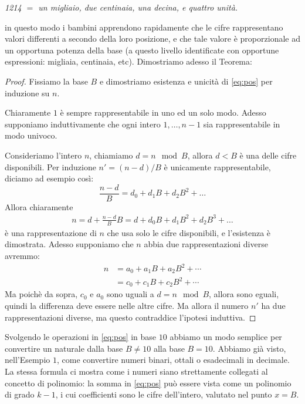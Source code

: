 {\it 1214 $ = $ un migliaio, due centinaia, una decina, e quattro unità.}

\noindent in questo modo i bambini apprendono rapidamente che le cifre
rappresentano valori differenti a secondo della loro posizione, e che tale
valore è proporzionale ad un opportuna potenza della base (a questo livello
identificate con opportune espressioni: migliaia, centinaia, etc). Dimostriamo
adesso il Teorema:

\begin{proof}%
Fissiamo la base $B$ e dimostriamo esistenza e unicità di \eqref{eq:pos} per induzione su $n$.

Chiaramente $1$ è sempre rappresentabile in uno ed un solo modo\footnotemark. Adesso supponiamo induttivamente che ogni intero
$1,\ldots,n-1$ sia rappresentabile in modo univoco.

\noindent Consideriamo l'intero $n$, chiamiamo $d = n \mod B$, allora $d < B$ è una delle cifre disponibili. Per induzione $n' = (n-d)/B$ è unicamente rappresentabile, diciamo ad esempio così:
\[ \frac{n-d}{B} = d_0 + d_1 B + d_2 B^2 + \ldots \]
Allora chiaramente
\begin{align*}
n = d + \frac{n-d}{B}B = d + d_0 B + d_1 B^2 + d_2 B^3 + \ldots
\end{align*}
è una rappresentazione di $n$ che usa solo le cifre disponibili, e l'esistenza è dimostrata.
Adesso supponiamo che $n$ abbia due rappresentazioni diverse avremmo:
\begin{align*}
n &= a_0 + a_1B + a_2B^2 + \cdots\\
  &= c_0 + c_1B + c_2B^2 + \cdots
\end{align*}
Ma poichè da sopra, $c_0$ e $a_0$ sono uguali a $d = n \mod B$, allora sono eguali, quindi la differenza deve essere nelle altre cifre. Ma allora il numero $n'$ ha due rappresentazioni diverse, ma questo
contraddice l'ipotesi induttiva.
\end{proof}

Svolgendo le operazioni in \eqref{eq:pos} in base $10$ abbiamo un modo semplice
per convertire un naturale dalla base $B \neq 10$ alla base $B = 10$.
Abbiamo già visto, nell'Esempio $1$, come convertire numeri binari, ottali
o esadecimali in decimale. La stessa formula ci mostra come i numeri siano
strettamente collegati al concetto di polinomio: la somma in \eqref{eq:pos} può
essere vista come un polinomio di grado $k-1$, i cui coefficienti sono le cifre
dell'intero, valutato nel punto $x = B$.

